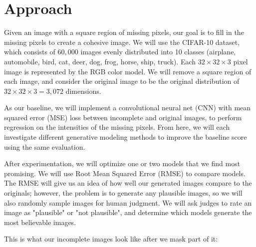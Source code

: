 \documentclass[10pt,twocolumn,letterpaper]{article}
\begin{document}
\section{Approach}
Given an image with a square region of missing pixels, our goal is to fill in the missing pixels to create a cohesive image. We will use the CIFAR-10 dataset, which consists of $60,000$ images evenly distributed into 10 classes (airplane, automobile, bird, cat, deer, dog, frog, horse, ship, truck). Each $32 \times 32 \times 3$ pixel image is represented by the RGB color model. We will remove a square region of each image, and consider the original image to be the original distribution of $32 \times 32 \times 3 = 3,072$ dimensions. 

\par As our baseline, we will implement a convolutional neural net (CNN) with mean squared error (MSE) loss between incomplete and original images, to perform regression on the intensities of the missing pixels. From here, we will each investigate different generative modeling methods to improve the baseline score using the same evaluation.

\par After experimentation, we will optimize one or two models that we find most promising. We will use Root Mean Squared Error (RMSE) to compare models. The RMSE will give us an idea of how well our generated images compare to the originals; however, the problem is to generate any plausible images, so we will also randomly sample images for human judgment. We will ask judges to rate an image as "plausible" or "not plausible", and determine which models generate the most believable images. 

This is what our incomplete images look like after we mask part of it:
\end{document}
